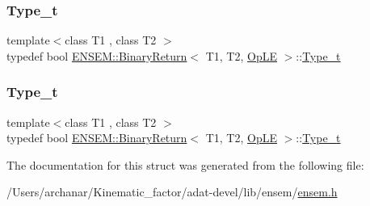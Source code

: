 \mbox{\label{structENSEM_1_1BinaryReturn_3_01T1_00_01T2_00_01OpLE_01_4_a052f794f01ea501a773007550e90886d}} 
\subsubsection{\texorpdfstring{Type\_t}{Type\_t}\hspace{0.1cm}{\footnotesize\ttfamily [2/3]}}
{\footnotesize\ttfamily template$<$class T1 , class T2 $>$ \\
typedef bool \mbox{\hyperlink{structENSEM_1_1BinaryReturn}{E\+N\+S\+E\+M\+::\+Binary\+Return}}$<$ T1, T2, \mbox{\hyperlink{structENSEM_1_1OpLE}{Op\+LE}} $>$\+::\mbox{\hyperlink{structENSEM_1_1BinaryReturn_3_01T1_00_01T2_00_01OpLE_01_4_a052f794f01ea501a773007550e90886d}{Type\+\_\+t}}}

\mbox{\label{structENSEM_1_1BinaryReturn_3_01T1_00_01T2_00_01OpLE_01_4_a052f794f01ea501a773007550e90886d}} 
\subsubsection{\texorpdfstring{Type\_t}{Type\_t}\hspace{0.1cm}{\footnotesize\ttfamily [3/3]}}
{\footnotesize\ttfamily template$<$class T1 , class T2 $>$ \\
typedef bool \mbox{\hyperlink{structENSEM_1_1BinaryReturn}{E\+N\+S\+E\+M\+::\+Binary\+Return}}$<$ T1, T2, \mbox{\hyperlink{structENSEM_1_1OpLE}{Op\+LE}} $>$\+::\mbox{\hyperlink{structENSEM_1_1BinaryReturn_3_01T1_00_01T2_00_01OpLE_01_4_a052f794f01ea501a773007550e90886d}{Type\+\_\+t}}}



The documentation for this struct was generated from the following file\+:\begin{DoxyCompactItemize}
\item 
/\+Users/archanar/\+Kinematic\+\_\+factor/adat-\/devel/lib/ensem/\mbox{\hyperlink{adat-devel_2lib_2ensem_2ensem_8h}{ensem.\+h}}\end{DoxyCompactItemize}
